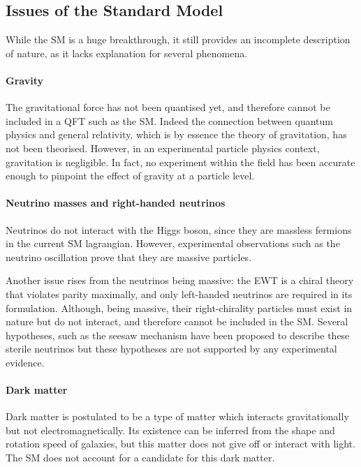 \subsection{Issues of the Standard Model}
\label{sec:SM_limits}

While the SM is a huge breakthrough, it still provides an incomplete description of nature, as it lacks explanation for several phenomena. 

\paragraph{Gravity} The gravitational force has not been quantised yet, and therefore cannot be included in a QFT such as the SM. Indeed the connection between quantum physics and general relativity, which is by essence the theory of gravitation, has not been theorised. However, in an experimental particle physics context, gravitation is negligible. In fact, no experiment within the field has been accurate enough to pinpoint the effect of gravity at a particle level.

\paragraph{Neutrino masses and right-handed neutrinos} Neutrinos do not interact with the Higgs boson, since they are massless fermions in the current SM lagrangian. However, experimental observations such as the neutrino oscillation \cite{PhysRevLett.81.1562,PhysRevLett.89.011301} prove that they are massive particles.

Another issue rises from the neutrinos being massive: the EWT is a chiral theory that violates parity maximally, and only left-handed neutrinos are required in its formulation. Although, being massive, their right-chirality particles must exist in nature but do not interact, and therefore cannot be included in the SM. Several hypotheses, such as the seesaw mechanism \cite{PhysRevD.22.2227,PhysRevLett.60.1813,PhysRevD.23.165,PhysRevLett.44.912,GellMann:1980vs,MINKOWSKI1977421} have been proposed to describe these sterile neutrinos but these hypotheses are not supported by any experimental evidence.

\paragraph{Dark matter} Dark matter is postulated to be a type of matter which interacts gravitationally but not electromagnetically. Its existence can be inferred from the shape and rotation speed of galaxies, but this matter does not give off or interact with light. The SM does not account for a candidate for this dark matter.

